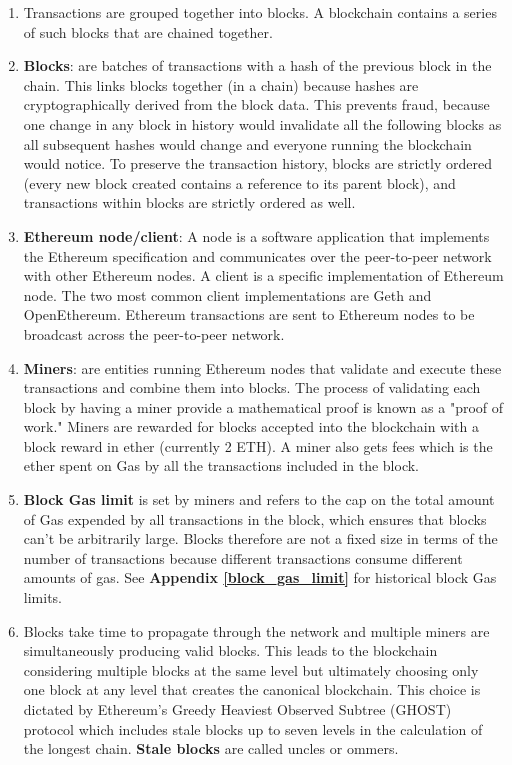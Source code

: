\begin{enumerate}
\item Transactions are grouped together into blocks. A blockchain contains a series of such blocks that are chained together.

\item\textbf{Blocks}: are batches of transactions with a hash of the previous block in the chain. This links blocks together (in a chain) because hashes are cryptographically derived from the block data. This prevents fraud, because one change in any block in history would invalidate all the following blocks as all subsequent hashes would change and everyone running the blockchain would notice. To preserve the transaction history, blocks are strictly ordered (every new block created contains a reference to its parent block), and transactions within blocks are strictly ordered as well.

\item\textbf{Ethereum node/client}: A node is a software application that implements the Ethereum specification and communicates over the peer-to-peer network with other Ethereum nodes. A client is a specific implementation of Ethereum node. The two most common client implementations are Geth and OpenEthereum. Ethereum transactions are sent to Ethereum nodes to be broadcast across the peer-to-peer network.

\item\textbf{Miners}: are entities running Ethereum nodes that validate and execute these transactions and combine them into blocks. The process of validating each block by having a miner provide a mathematical proof is known as a "proof of work." Miners are rewarded for blocks accepted into the blockchain with a block reward in ether (currently 2 ETH). A miner also gets fees which is the ether spent on Gas by all the transactions included in the block.

\item\textbf{Block Gas limit} is set by miners and refers to the cap on the total amount of Gas expended by all transactions in the block, which ensures that blocks can't be arbitrarily large. Blocks therefore are not a fixed size in terms of the number of transactions because different transactions consume different amounts of gas. See \textbf{Appendix \ref{block_gas_limit}} for historical block Gas limits.

\item Blocks take time to propagate through the network and multiple miners are simultaneously producing valid blocks. This leads to the blockchain considering multiple blocks at the same level but ultimately choosing only one block at any level that creates the canonical blockchain. This choice is dictated by Ethereum's Greedy Heaviest Observed Subtree (GHOST) protocol which includes stale blocks up to seven levels in the calculation of the longest chain. \textbf{Stale blocks} are called uncles or ommers.


\end{enumerate}
